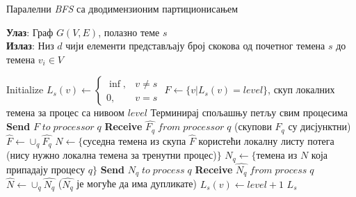\begin{algorithm}[H]
\caption{Паралелни \textit{BFS} са дводимензионим партиционисањем}
\label{algorith:bfs-distance-2D-par-pseudo}
\hspace*{\algorithmicindent} \textbf{Улаз}: Граф $G(V, E)$, полазно теме $s$ \\
\hspace*{\algorithmicindent} \textbf{Излаз}: Низ $d$ чији елементи представљају број скокова од почетног темена $s$ до темена $v_i \in V$
\begin{algorithmic}[1]
\State Initialize $L_s(v) \gets
\begin{cases}
\inf, &v \neq s\\
0, &v = s
\end{cases}
$
\State $F \gets \{ v | L_s(v) = level \}$, скуп локалних темена за процес са нивоом $level$
\State Терминирај спољашњу петљу свим процесима
\EndIf
{}
\State \textbf{Send} $F \; to \; processor \; q$
\State \textbf{Receive} $\widehat{F_q} \; from \; processor \; q$ (скупови $F_q$ су дисјунктни)
\EndFor
\State $\widehat{F} \gets \cup_q \widehat{F_q}$
\State $N \gets \{ $суседна темена из скупа $\widehat{F}$ користећи локалну листу потега (нису нужно локална темена за тренутни процес)$\}$
\State $N_q \gets \{$темена из $N$ која припадају процесу $q\}$
\State \textbf{Send} $N_q \; to \; process \; q$
\State \textbf{Receive} $\widehat{N_q} \; from \; process \; q$
\EndFor
\State $\widehat{N} \gets \cup_q \widehat{N_q}$ \; ($\widehat{N_q}$ је могуће да има дупликате)
\State $L_s(v) \gets level + 1$
\EndFor
\EndFor
\State \Return $L_s$
\EndProcedure
\end{algorithmic}
\end{algorithm}